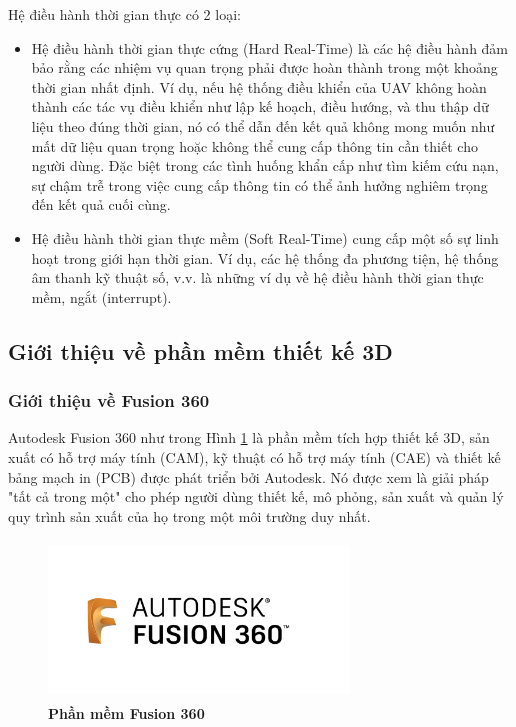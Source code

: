 \documentclass{article} %
\begin{document}
	Hệ điều hành thời gian thực có 2 loại:
	\begin{itemize}
		\item Hệ điều hành thời gian thực cứng (Hard Real-Time) là các hệ điều hành đảm bảo rằng các nhiệm vụ quan trọng phải được hoàn thành trong một khoảng thời gian nhất định. Ví dụ, nếu hệ thống điều khiển của UAV không hoàn thành các tác vụ điều khiển như lập kế hoạch, điều hướng, và thu thập dữ liệu theo đúng thời gian, nó có thể dẫn đến kết quả không mong muốn như mất dữ liệu quan trọng hoặc không thể cung cấp thông tin cần thiết cho người dùng. Đặc biệt trong các tình huống khẩn cấp như tìm kiếm cứu nạn, sự chậm trễ trong việc cung cấp thông tin có thể ảnh hưởng nghiêm trọng đến kết quả cuối cùng.
		\item Hệ điều hành thời gian thực mềm (Soft Real-Time) cung cấp một số sự linh hoạt trong giới hạn thời gian. Ví dụ, các hệ thống đa phương tiện, hệ thống âm thanh kỹ thuật số, v.v. là những ví dụ về hệ điều hành thời gian thực mềm,   ngắt (interrupt).
	\end{itemize}
	
	
	\subsection{Giới thiệu về phần mềm thiết kế 3D}
	\subsubsection{Giới thiệu về Fusion 360}
	Autodesk Fusion 360 như trong Hình \ref{Fusion360} là phần mềm tích hợp thiết kế 3D, sản xuất có hỗ trợ máy tính (CAM), kỹ thuật có hỗ trợ máy tính (CAE) và thiết kế bảng mạch in (PCB) được phát triển bởi Autodesk. Nó được xem là giải pháp "tất cả trong một" cho phép người dùng thiết kế, mô phỏng, sản xuất và quản lý quy trình sản xuất của họ trong một môi trường duy nhất.
	
	\begin{figure}[!ht]
		\centering
		\includegraphics[width=8cm,height=4.2cm]{Images/Fusion360_Logo.png}
		\caption[Phần mềm Fusion 360]{\bfseries \fontsize{12pt}{0pt}\selectfont Phần mềm Fusion 360}
		\label{Fusion360}
	\end{figure}
	
\end{document}
